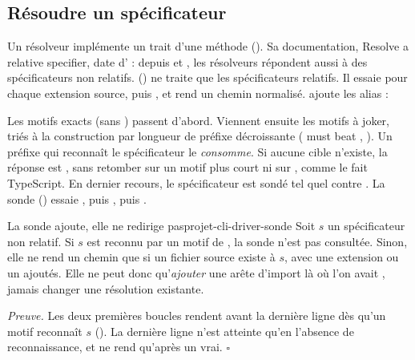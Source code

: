 \subsection{Résoudre un spécificateur}

Un résolveur implémente un trait d'une méthode (). Sa documentation, \og Resolve a relative specifier\fg{}, date d' : depuis  et , les résolveurs  répondent aussi à des spécificateurs non relatifs.  () ne traite que les spécificateurs relatifs. Il essaie  pour chaque extension source, puis , et rend un chemin normalisé.  ajoute les alias :


Les motifs exacts (sans \code{*}) passent d'abord. Viennent ensuite les motifs à joker, triés à la construction par longueur de préfixe décroissante (\og {} must beat \fg{}, ). Un préfixe qui reconnaît le spécificateur le \emph{consomme}. Si aucune cible n'existe, la réponse est , sans retomber sur un motif plus court ni sur , comme le fait TypeScript. En dernier recours, le spécificateur est sondé tel quel contre . La sonde () essaie , puis , puis .

\begin{proposition}{La sonde  ajoute, elle ne redirige pas}{projet-cli-driver-sonde}
Soit $s$ un spécificateur non relatif. Si $s$ est reconnu par un motif de , la sonde  n'est pas consultée. Sinon, elle ne rend un chemin que si un fichier source existe à $s$, avec une extension ou un  ajoutés. Elle ne peut donc qu'\emph{ajouter} une arête d'import là où l'on avait , jamais changer une résolution existante.
\end{proposition}
\noindent\emph{Preuve.} Les deux premières boucles rendent avant la dernière ligne dès qu'un motif reconnaît $s$ (). La dernière ligne n'est atteinte qu'en l'absence de reconnaissance, et  ne rend  qu'après un  vrai. \hfill$\square$

